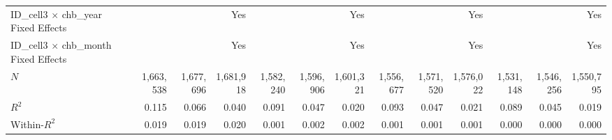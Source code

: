 \begin{tabular}{lrrrrrrrrrrrr}
ID\_cell3 $\times$ chb\_year Fixed Effects  &              &              &          Yes &              &              &          Yes &              &              &          Yes &              &              &          Yes \\ 
ID\_cell3 $\times$ chb\_month Fixed Effects &              &              &          Yes &              &              &          Yes &              &              &          Yes &              &              &          Yes \\ 
\midrule
$N$                                         &    1,663,538 &    1,677,696 &    1,681,918 &    1,582,240 &    1,596,906 &    1,601,321 &    1,556,677 &    1,571,520 &    1,576,022 &    1,531,148 &    1,546,256 &    1,550,795 \\ 
$R^2$                                       &        0.115 &        0.066 &        0.040 &        0.091 &        0.047 &        0.020 &        0.093 &        0.047 &        0.021 &        0.089 &        0.045 &        0.019 \\ 
Within-$R^2$                                &        0.019 &        0.019 &        0.020 &        0.001 &        0.002 &        0.002 &        0.001 &        0.001 &        0.001 &        0.000 &        0.000 &        0.000 \\ 
\bottomrule
\end{tabular}
